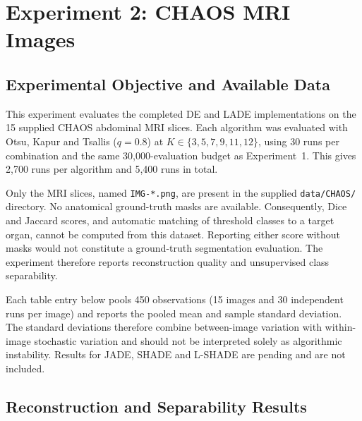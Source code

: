 \documentclass[review]{elsarticle}
\begin{document}
\section{Experiment 2: CHAOS MRI Images}
\label{sec:experiment2}
\subsection{Experimental Objective and Available Data}

This experiment evaluates the completed DE and LADE implementations on the
15 supplied CHAOS abdominal MRI slices. Each algorithm was evaluated with
Otsu, Kapur and Tsallis ($q=0.8$) at
$K\in\{3,5,7,9,11,12\}$, using 30 runs per combination and the same
30,000-evaluation budget as Experiment~1. This gives 2,700 runs per
algorithm and 5,400 runs in total.

Only the MRI slices, named \texttt{IMG-*.png}, are present in the supplied
\texttt{data/CHAOS/} directory. No anatomical ground-truth masks are
available. Consequently, Dice and Jaccard scores, and automatic matching of
threshold classes to a target organ, cannot be computed from this dataset.
Reporting either score without masks would not constitute a ground-truth
segmentation evaluation. The experiment therefore reports reconstruction
quality and unsupervised class separability.

Each table entry below pools 450 observations (15 images and 30 independent
runs per image) and reports the pooled mean and sample standard deviation.
The standard deviations therefore combine between-image variation with
within-image stochastic variation and should not be interpreted solely as
algorithmic instability. Results for JADE, SHADE and L-SHADE are pending and
are not included.

\subsection{Reconstruction and Separability Results}
\end{document}
